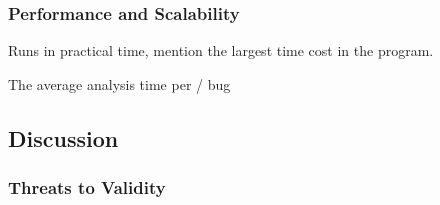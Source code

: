 \subsubsection{Performance and Scalability}

Runs in practical time, mention the largest time cost in the program.

The average analysis time per / bug

\subsection{Discussion}

\subsubsection{Threats to Validity}
